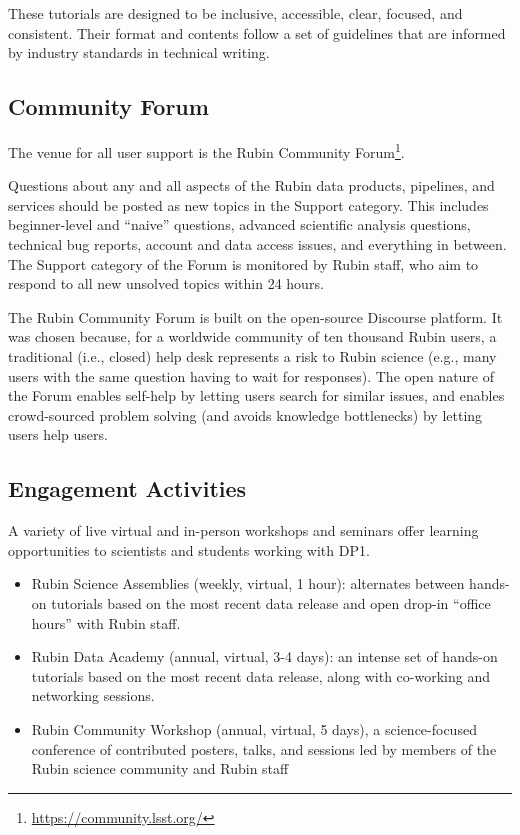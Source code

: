 These tutorials are designed to be inclusive, accessible, clear, focused, and consistent.
Their format and contents follow a set of guidelines \citep{RTN-045} that are informed by industry standards in technical writing.


\subsection{Community Forum
\label{ssec:forum}}

The venue for all user support is the Rubin Community Forum\footnote{\url{https://community.lsst.org/}}.

Questions about any and all aspects of the Rubin data products, pipelines, and services should be posted as new topics in the Support category.
This includes beginner-level and ``naive'' questions, advanced scientific analysis questions, technical bug reports, account and data access issues, and everything in between.
The Support category of the Forum is monitored by Rubin staff, who aim to respond to all new unsolved topics within 24 hours.

The Rubin Community Forum is built on the open-source Discourse platform.
It was chosen because, for a worldwide community of ten thousand Rubin users, a traditional (i.e., closed) help desk represents a risk to Rubin science (e.g., many users with the same question having to wait for responses).
The open nature of the Forum enables self-help by letting users search for similar issues, and enables crowd-sourced problem solving (and avoids knowledge bottlenecks) by letting users help users.


\subsection{Engagement Activities
\label{ssec:engagement}}

A variety of live virtual and in-person workshops and seminars offer learning opportunities to scientists and students working with \gls{DP1}.

\begin{itemize}
\item Rubin Science Assemblies (weekly, virtual, 1 hour): alternates between hands-on tutorials based on the most recent data release and open drop-in ``office hours'' with Rubin staff.
\item Rubin Data Academy (annual, virtual, 3-4 days): an intense set of hands-on tutorials based on the most recent data release, along with co-working and networking sessions.
\item Rubin Community Workshop (annual, virtual, 5 days), a science-focused conference of contributed posters, talks, and sessions led by members of the Rubin science community and Rubin staff
\end{itemize}

